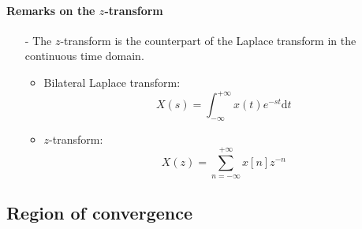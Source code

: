 \paragraph{Remarks on the $z$-transform}
\begin{itemize}
    \item[-] The $z$-transform is the counterpart of the Laplace transform in the continuous time domain.
    \begin{itemize}
        \item Bilateral Laplace transform:
        \[
            X(s) = \int_{-\infty}^{+\infty} x(t) e^{-st} \mathrm{d}t
        \]
        \item $z$-transform:
        \[
            X(z) = \sum_{n=-\infty}^{+\infty} x[n] z^{-n}
        \]
    \end{itemize}
\end{itemize}

\subsection{Region of convergence}

